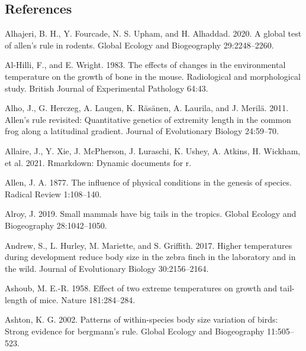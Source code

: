 \documentclass[]{article}
\begin{document}
\vspace{10mm}

\hypertarget{references}{%
\subsection{References}\label{references}}

\setlength{\parindent}{-0.25in}
\setlength{\leftskip}{0.25in}

\noindent

\hypertarget{refs}{}
\leavevmode\hypertarget{ref-Alhajeri2020}{}%
Alhajeri, B. H., Y. Fourcade, N. S. Upham, and H. Alhaddad. 2020. A
global test of allen's rule in rodents. Global Ecology and Biogeography
29:2248--2260.

\leavevmode\hypertarget{ref-Al-Hilli1983}{}%
Al-Hilli, F., and E. Wright. 1983. The effects of changes in the
environmental temperature on the growth of bone in the mouse.
Radiological and morphological study. British Journal of Experimental
Pathology 64:43.

\leavevmode\hypertarget{ref-Alho2011}{}%
Alho, J., G. Herczeg, A. Laugen, K. Räsänen, A. Laurila, and J. Merilä.
2011. Allen's rule revisited: Quantitative genetics of extremity length
in the common frog along a latitudinal gradient. Journal of Evolutionary
Biology 24:59--70.

\leavevmode\hypertarget{ref-Allaire2021}{}%
Allaire, J., Y. Xie, J. McPherson, J. Luraschi, K. Ushey, A. Atkins, H.
Wickham, et al. 2021. Rmarkdown: Dynamic documents for r.

\leavevmode\hypertarget{ref-Allen1877}{}%
Allen, J. A. 1877. The influence of physical conditions in the genesis
of species. Radical Review 1:108--140.

\leavevmode\hypertarget{ref-Alroy2019}{}%
Alroy, J. 2019. Small mammals have big tails in the tropics. Global
Ecology and Biogeography 28:1042--1050.

\leavevmode\hypertarget{ref-Andrew2017}{}%
Andrew, S., L. Hurley, M. Mariette, and S. Griffith. 2017. Higher
temperatures during development reduce body size in the zebra finch in
the laboratory and in the wild. Journal of Evolutionary Biology
30:2156--2164.

\leavevmode\hypertarget{ref-Ashoub1958}{}%
Ashoub, M. E.-R. 1958. Effect of two extreme temperatures on growth and
tail-length of mice. Nature 181:284--284.

\leavevmode\hypertarget{ref-Ashton2002}{}%
Ashton, K. G. 2002. Patterns of within-species body size variation of
birds: Strong evidence for bergmann's rule. Global Ecology and
Biogeography 11:505--523.
\end{document}
